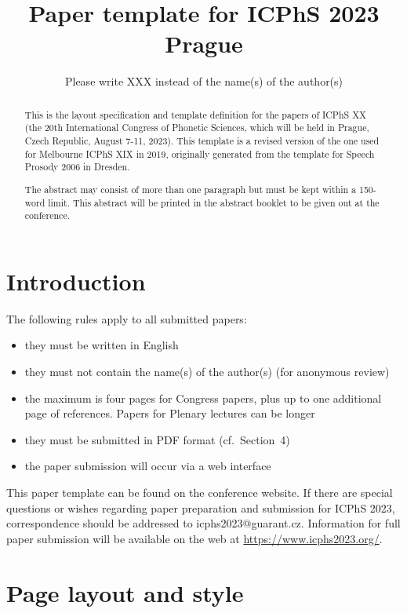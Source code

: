 \documentclass[a4paper,11pt,twocolumn]{article}
\title{Paper template for {ICPhS} 2023 Prague}
\author{Please write XXX instead of the name(s) of the author(s)}
\begin{document}
\maketitle

\begin{abstract}
This is the layout specification and template definition for the papers of ICPhS XX (the 20th International Congress of Phonetic Sciences, which will be held in Prague, Czech Republic, August 7-11, 2023). This template is a revised version of the one used for Melbourne ICPhS XIX in 2019, originally generated from the template for Speech Prosody 2006 in Dresden.

The abstract may consist of more than one paragraph but must be kept within a 150-word limit. This abstract will be printed in the abstract booklet to be given out at the conference.
\end{abstract}



\section{Introduction}

The following rules apply to all submitted papers:

\begin{itemize}
\item they must be written in English
\item they must not contain the name(s) of the author(s) (for
anonymous review)
\item the maximum is four pages for Congress papers, plus up to one additional page of references. Papers for Plenary lectures can be longer
\item they must be submitted in PDF format (cf.\ Section~4)
\item the paper submission will occur via a web interface
\end{itemize}
This paper template can be found on the conference website. If there
are special questions or wishes regarding paper preparation and
submission for ICPhS 2023, correspondence should be addressed to
icphs2023@guarant.cz. Information for full paper submission will be
available on the web at \url{https://www.icphs2023.org/}.



\section{Page layout and style}
\end{document}
